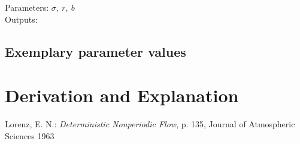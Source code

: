 \documentclass[10pt,a4paper]{article}
\begin{document}
	
	\noindent
	Parameters: $\sigma,~r,~b$ %
	\\
	Outputs:  %
	
	
	
	\subsection{Exemplary parameter values}
	

	
	\section{Derivation and Explanation} %
	
	
	\begin{thebibliography}{10}		
		Lorenz, E. N.: 
		\textit{Deterministic Nonperiodic Flow}, p. 135, Journal of Atmospheric Sciences 1963
	\end{thebibliography}
\end{document}

